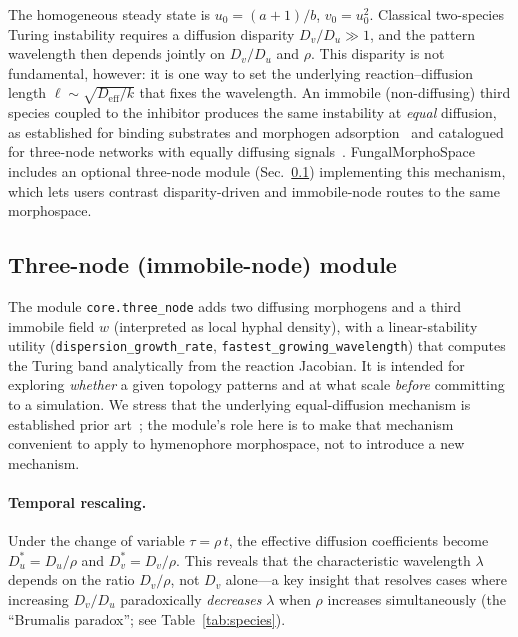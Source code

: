 \documentclass[review,3p]{elsarticle}
\begin{document}
The homogeneous steady state is
$u_0 = (a + 1)/b$, $v_0 = u_0^2$. Classical two-species Turing
instability requires a diffusion disparity $D_v/D_u \gg 1$, and the
pattern wavelength then depends jointly on $D_v/D_u$ and $\rho$. This
disparity is not fundamental, however: it is one way to set the
underlying reaction--diffusion length $\ell \sim \sqrt{D_\text{eff}/k}$
that fixes the wavelength. An immobile (non-diffusing) third species
coupled to the inhibitor produces the same instability at \emph{equal}
diffusion, as established for binding substrates and morphogen
adsorption~\cite{korvasova2015,nesterenko2017} and catalogued for
three-node networks with equally diffusing signals~\cite{marcon2016}.
FungalMorphoSpace includes an optional three-node module
(Sec.~\ref{sec:threenode}) implementing this mechanism, which lets users
contrast disparity-driven and immobile-node routes to the same morphospace.

\subsection{Three-node (immobile-node) module}
\label{sec:threenode}

The module \texttt{core.three\_node} adds two diffusing morphogens and a
third immobile field $w$ (interpreted as local hyphal density), with a
linear-stability utility (\texttt{dispersion\_growth\_rate},
\texttt{fastest\_growing\_wavelength}) that computes the Turing band
analytically from the reaction Jacobian. It is intended for exploring
\emph{whether} a given topology patterns and at what scale \emph{before}
committing to a simulation. We stress that the underlying equal-diffusion
mechanism is established prior art~\cite{korvasova2015,nesterenko2017,marcon2016,raspopovic2014};
the module's role here is to make that mechanism convenient to apply to
hymenophore morphospace, not to introduce a new mechanism.

\paragraph{Temporal rescaling.}
Under the change of variable $\tau = \rho\,t$, the effective
diffusion coefficients become $D_u^* = D_u / \rho$ and
$D_v^* = D_v / \rho$. This reveals that the characteristic wavelength
$\lambda$ depends on the ratio $D_v / \rho$, not $D_v$ alone---a key
insight that resolves cases where increasing $D_v/D_u$ paradoxically
\emph{decreases} $\lambda$ when $\rho$ increases simultaneously
(the ``Brumalis paradox''; see Table~\ref{tab:species}).
\end{document}
